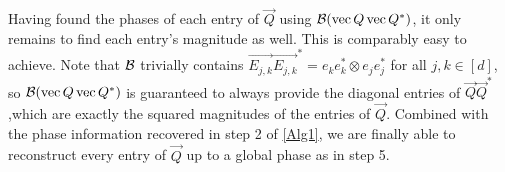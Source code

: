 Having found the phases of each entry of $\vec{Q}$ using $\mathcal{B} ( \operatorname{vec}{Q} \operatorname{vec}{Q}^* )$, it only remains to find each entry's magnitude as well.  This is comparably easy to achieve.  Note that $\mathcal{B}$ trivially contains $\vec{E_{j,k}}\vec{E_{j,k}}^* = e_ke_k^* \otimes e_je_j^*$ for all $j, k \in [d]$, so $\mathcal{B} ( \operatorname{vec}{Q} \operatorname{vec}{Q}^* )$ is guaranteed to always provide the diagonal entries of $\vec{Q} \vec{Q}^*$,which are exactly the squared magnitudes of the entries of $\vec{Q}$.  Combined with the phase information recovered in step 2 of \ref{Alg1}, we are finally able to reconstruct every entry of $\vec{Q}$ up to a global phase as in step 5.
